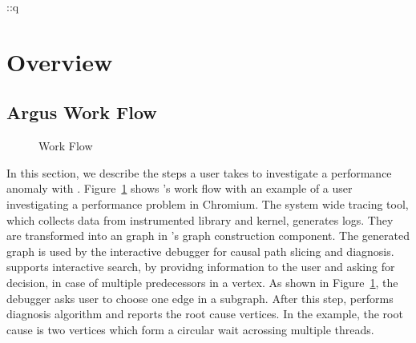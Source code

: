 ::q\section{Overview}\label{sec:overview}

\subsection{Argus Work Flow}
\begin{figure}[tb]
    \centering
	
    \caption{\xxx Work Flow}
    \label{fig:argus-overview}
\end{figure}

In this section, we describe the steps a user takes to investigate a performance
anomaly with \xxx. Figure~\ref{fig:argus-overview} shows \xxx's work flow with
an example of a user investigating a performance problem in Chromium. The system
wide tracing tool, which collects data from \xxx instrumented library and
kernel, generates logs. They are transformed into an graph in \xxx's
graph construction component. The generated graph is used by the interactive
debugger for causal path slicing and diagnosis. \xxx supports interactive
search, by providng information to the user and asking for decision, in case of
multiple predecessors in a vertex. As shown in Figure~\ref{fig:argus-overview},
the debugger asks user to choose one edge in a subgraph. After this step,
\xxx performs diagnosis algorithm and reports the root cause vertices. In the
example, the root cause is two vertices which form a circular wait acrossing
multiple threads.



%
%

